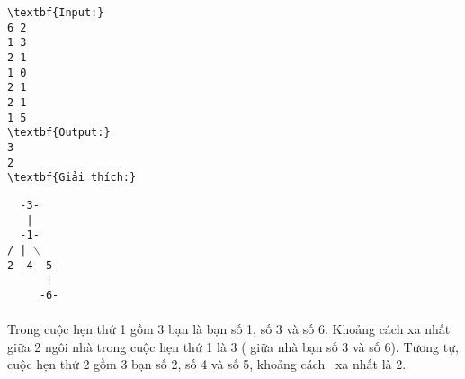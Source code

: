 \begin{verbatim}
\textbf{Input:}
6 2
1 3
2 1
1 0
2 1
2 1
1 5
\textbf{Output:}
3
2
\textbf{Giải thích:}\end{verbatim}


\texttt{  -3-
\\   |
\\  -1-
\\/ | $\backslash$
\\2  4  5
\\      |
\\     -6-}
\\
\\​Trong cuộc hẹn thứ 1 gồm 3 bạn là bạn số 1, số 3 và số 6. Khoảng cách xa nhất giữa 2 ngôi nhà trong cuộc hẹn thứ 1 là 3 ( giữa nhà bạn số 3 và số 6). Tương tự, cuộc hẹn thứ 2 gồm 3 bạn số 2, số 4 và số 5, khoảng cách  xa nhất là 2.

 

 

 

 

 

 